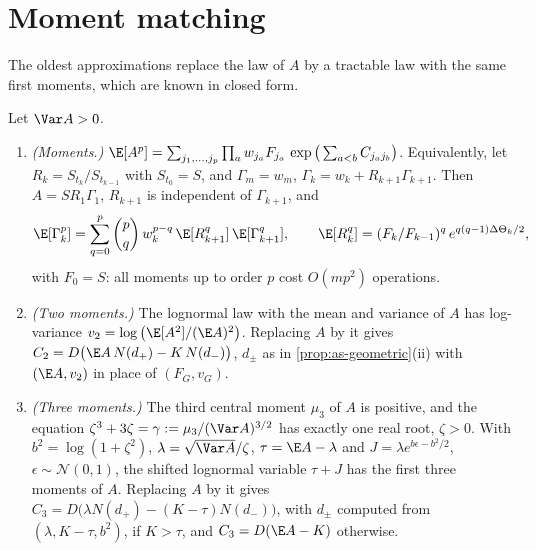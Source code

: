 \section{Moment matching}\label{sec:as-moments}

The oldest approximations replace the law of $A$ by a tractable law with the same first
moments, which are known in closed form.

\begin{proposition}\label{prop:as-moment-matching}
Let $\Var A>0$.
\begin{enumerate}[label=(\roman*)]
  \item \emph{(Moments.)} $\E[A^p]=\sum_{j_1,\dots,j_p}\prod_{a}w_{j_a}F_{j_a}\,
    \exp\big(\sum_{a<b}C_{j_aj_b}\big)$. Equivalently, let $R_k=S_{t_k}/S_{t_{k-1}}$ with
    $S_{t_0}=S$, and $\Gamma_m=w_m$, $\Gamma_k=w_k+R_{k+1}\Gamma_{k+1}$. Then $A=SR_1\Gamma_1$,
    $R_{k+1}$ is independent of $\Gamma_{k+1}$, and
    \[
      \E[\Gamma_k^p]=\sum_{q=0}^p\binom pq\,w_k^{p-q}\,\E[R_{k+1}^q]\,\E[\Gamma_{k+1}^q],\qquad
      \E[R_k^q]=(F_k/F_{k-1})^q\,e^{q(q-1)\Delta\Theta_k/2},
    \]
    with $F_0=S$: all moments up to order $p$ cost $O(mp^2)$ operations.
  \item \emph{(Two moments.)} The lognormal law with the mean and variance of $A$ has
    log-variance $v_2=\log\big(\E[A^2]/(\E A)^2\big)$. Replacing $A$ by it gives
    $C_2=D\big(\E A\,N(d_+)-K\,N(d_-)\big)$, $d_\pm$ as in \cref{prop:as-geometric}(ii)
    with $(\E A,v_2)$ in place of $(F_G,v_G)$.
  \item \emph{(Three moments.)} The third central moment $\mu_3$ of $A$ is positive, and the
    equation $\zeta^3+3\zeta=\gamma:=\mu_3/(\Var A)^{3/2}$ has exactly one real root, $\zeta>0$.
    With $b^2=\log(1+\zeta^2)$, $\lambda=\sqrt{\Var A}/\zeta$, $\tau=\E A-\lambda$ and
    $J=\lambda e^{b\epsilon-b^2/2}$, $\epsilon\sim\mathcal N(0,1)$, the shifted lognormal variable
    $\tau+J$ has the first three moments of $A$. Replacing $A$ by it gives
    $C_3=D\big(\lambda N(d_+)-(K-\tau)N(d_-)\big)$, with $d_\pm$ computed from
    $(\lambda,K-\tau,b^2)$, if $K>\tau$, and $C_3=D(\E A-K)$ otherwise.
\end{enumerate}
\end{proposition}

